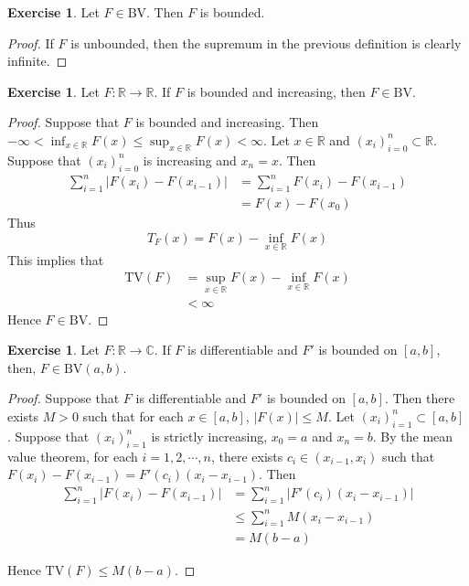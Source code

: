 \documentclass[12pt]{amsart}
\theoremstyle{definition}
\newtheorem{ex}[definition]{Exercise}
\newcommand{\C}{\mathbb{C}}
\newcommand{\R}{\mathbb{R}}
\newcommand{\BV}{\text{BV}}
\newcommand{\TV}{\text{TV}}
\newcommand{\lex}[1]{\label{ex:#1}}
\begin{document}
	\begin{ex} \lex{00000} 
		Let $F \in \BV$. Then $F$ is bounded.
	\end{ex}
	
	\begin{proof}
		If $F$ is unbounded, then the supremum in the previous definition is clearly infinite.
	\end{proof}
	
	\begin{ex} \lex{00000} 
		Let $F:\R \rightarrow \R$. If $F$ is bounded and increasing, then $F \in \BV$.
	\end{ex}
	
	\begin{proof}
		Suppose that $F$ is bounded and increasing. Then $-\infty<\inf_{x \in \R}F(x) \leq \sup_{x \in \R}F(x)<\infty$. Let $x \in \R$ and $(x_i)_{i=0}^n \subset \R$. Suppose that $(x_i)_{i=0}^n$ is increasing and $x_n=x$. Then 
		\begin{align*}
			\sum_{i=1}^n|F(x_i)-F(x_{i-1})| 
			&= \sum_{i=1}^n F(x_i)-F(x_{i-1})\\
			&= F(x)-F(x_0)
		\end{align*}
		Thus 
		$$T_F(x) = F(x)-\inf_{x \in \R}F(x)$$ 
		This implies that 
		\begin{align*}
			\TV(F) 
			&= \sup_{x \in \R}F(x)-\inf_{x \in \R}F(x)\\
			&<\infty
		\end{align*}
		Hence $F \in \BV$.
	\end{proof}
	
	\begin{ex} \lex{00000} 
		Let $F:\R \rightarrow \C$. If $F$ is differentiable and $F'$ is bounded on $[a,b]$, then, $F \in \BV(a,b)$. 
	\end{ex}
	
	\begin{proof}
		Suppose that $F$ is differentiable and $F'$ is bounded on $[a,b]$. Then there exists $M>0$ such that for each $x \in [a,b]$, $|F(x)| \leq M$. Let $(x_i)_{i=1}^n \subset [a,b]$. Suppose that $(x_i)_{i=1}^n$ is strictly increasing, $x_0=a$ and $x_n=b$. By the mean value theorem, for each $i =1,2, \cdots, n$, there exists $c_i\in (x_{i-1}, x_i)$ such that $F(x_i)-F(x_{i-1})=F'(c_i)(x_i-x_{i-1})$. Then 
		\begin{align*}
			\sum_{i=1}^n|F(x_i)-F(x_{i-1})|
			&= \sum_{i=1}^n|F'(c_i)(x_i-x_{i-1})|\\
			&\leq  \sum_{i=1}^nM(x_i-x_{i-1})\\
			&=M(b-a)
		\end{align*}
		
		Hence $\TV(F) \leq M(b-a)$.
	\end{proof}
	
\end{document}
